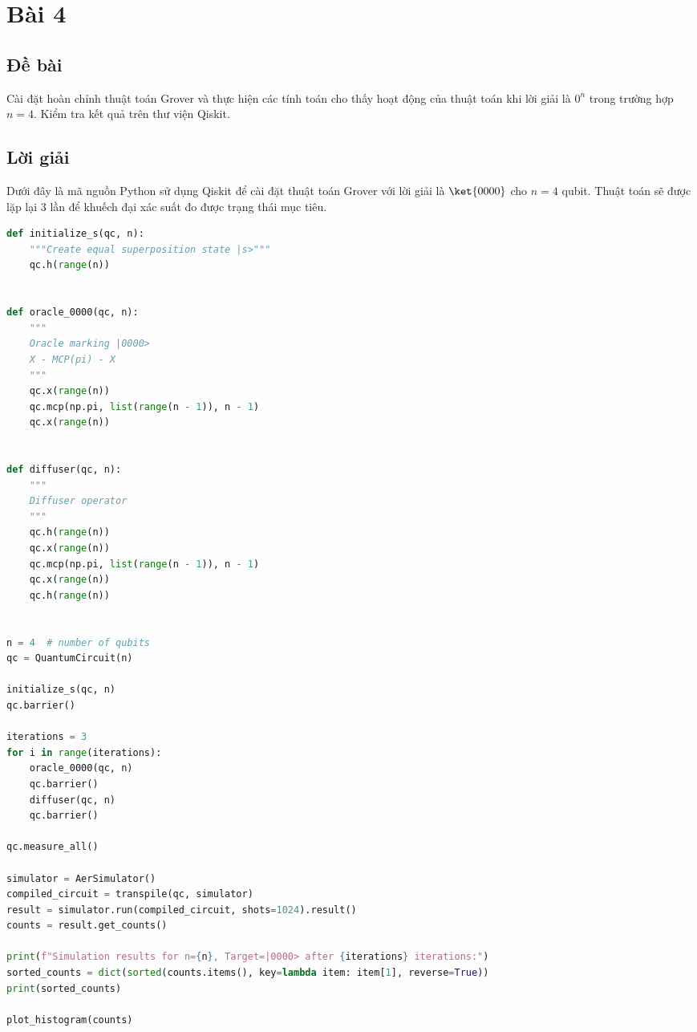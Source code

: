 \section{Bài 4}

\subsection{Đề bài}

Cài đặt hoàn chỉnh thuật toán Grover và thực hiện các tính toán cho thấy hoạt động của thuật toán khi lời giải là $0^n$ trong trường hợp $n=4$. Kiểm tra kết quả trên thư viện Qiskit.

\subsection{Lời giải}

Dưới đây là mã nguồn Python sử dụng Qiskit để cài đặt thuật toán Grover với lời giải là $\ket{0000}$ cho $n=4$ qubit. Thuật toán sẽ được lặp lại 3 lần để khuếch đại xác suất đo được trạng thái mục tiêu.
\begin{lstlisting}[language=Python]
def initialize_s(qc, n):
    """Create equal superposition state |s>"""
    qc.h(range(n))


def oracle_0000(qc, n):
    """
    Oracle marking |0000>
    X - MCP(pi) - X
    """
    qc.x(range(n))
    qc.mcp(np.pi, list(range(n - 1)), n - 1)
    qc.x(range(n))


def diffuser(qc, n):
    """
    Diffuser operator
    """
    qc.h(range(n))
    qc.x(range(n))
    qc.mcp(np.pi, list(range(n - 1)), n - 1)
    qc.x(range(n))
    qc.h(range(n))


n = 4  # number of qubits
qc = QuantumCircuit(n)

initialize_s(qc, n)
qc.barrier()

iterations = 3
for i in range(iterations):
    oracle_0000(qc, n)
    qc.barrier()
    diffuser(qc, n)
    qc.barrier()

qc.measure_all()

simulator = AerSimulator()
compiled_circuit = transpile(qc, simulator)
result = simulator.run(compiled_circuit, shots=1024).result()
counts = result.get_counts()

print(f"Simulation results for n={n}, Target=|0000> after {iterations} iterations:")
sorted_counts = dict(sorted(counts.items(), key=lambda item: item[1], reverse=True))
print(sorted_counts)

plot_histogram(counts)
\end{lstlisting}

